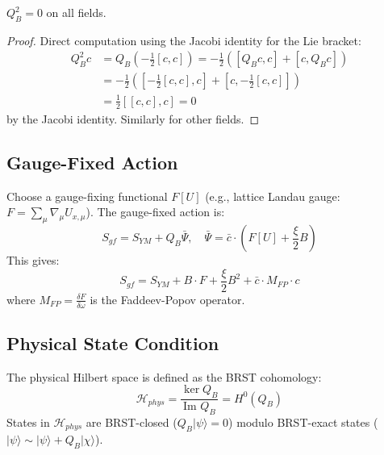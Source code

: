 \begin{theorem}[Nilpotency]\label{thm:brst-nilpotent}
$Q_B^2 = 0$ on all fields.
\end{theorem}

\begin{proof}
Direct computation using the Jacobi identity for the Lie bracket:
\begin{align}
    Q_B^2 c &= Q_B(-\frac{1}{2}[c,c]) = -\frac{1}{2}([Q_B c, c] + [c, Q_B c]) \\
    &= -\frac{1}{2}([-\frac{1}{2}[c,c], c] + [c, -\frac{1}{2}[c,c]]) \\
    &= \frac{1}{2}[[c,c], c] = 0
\end{align}
by the Jacobi identity. Similarly for other fields.
\end{proof}

\subsection{Gauge-Fixed Action}

\begin{definition}
Choose a gauge-fixing functional $F[U]$ (e.g., lattice Landau gauge: $F = \sum_\mu \nabla_\mu U_{x,\mu}$). The gauge-fixed action is:
\begin{equation}
    S_{gf} = S_{YM} + Q_B \bar{\Psi}, \quad \bar{\Psi} = \bar{c} \cdot (F[U] + \frac{\xi}{2} B)
\end{equation}
This gives:
\begin{equation}
    S_{gf} = S_{YM} + B \cdot F + \frac{\xi}{2} B^2 + \bar{c} \cdot M_{FP} \cdot c
\end{equation}
where $M_{FP} = \frac{\delta F}{\delta \omega}$ is the Faddeev-Popov operator.
\end{definition}

\subsection{Physical State Condition}

\begin{definition}
The physical Hilbert space is defined as the BRST cohomology:
\begin{equation}
    \mathcal{H}_{phys} = \frac{\ker Q_B}{\text{Im } Q_B} = H^0(Q_B)
\end{equation}
States in $\mathcal{H}_{phys}$ are BRST-closed ($Q_B |\psi\rangle = 0$) modulo BRST-exact states ($|\psi\rangle \sim |\psi\rangle + Q_B |\chi\rangle$).
\end{definition}


